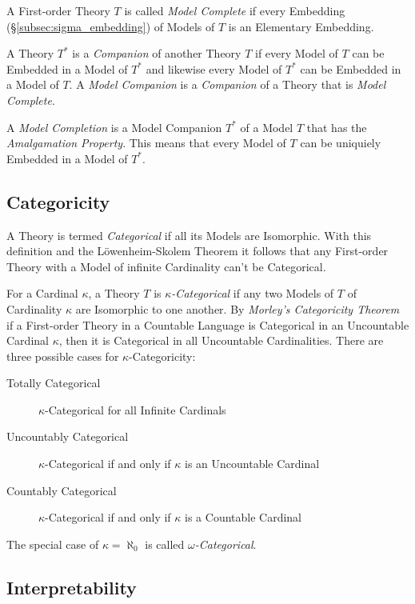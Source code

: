 \documentclass{article}
\begin{document}
A First-order Theory $T$ is called \emph{Model Complete} if every
Embedding (\S\ref{subsec:sigma_embedding}) of Models of $T$ is an
Elementary Embedding.

A Theory $T^*$ is a \emph{Companion} of another Theory $T$ if every
Model of $T$ can be Embedded in a Model of $T^*$ and likewise every
Model of $T^*$ can be Embedded in a Model of $T$. A \emph{Model
  Companion} is a \emph{Companion} of a Theory that is \emph{Model
  Complete}.

A \emph{Model Completion} is a Model Companion $T^*$ of a Model $T$
that has the \emph{Amalgamation Property}. This means that every Model
of $T$ can be uniquiely Embedded in a Model of $T^*$.

\subsection{Categoricity}

A Theory is termed \emph{Categorical} if all its Models are
Isomorphic. With this definition and the L\"owenheim-Skolem Theorem it
follows that any First-order Theory with a Model of infinite
Cardinality can't be Categorical.

For a Cardinal $\kappa$, a Theory $T$ is \emph{$\kappa$-Categorical}
if any two Models of $T$ of Cardinality $\kappa$ are Isomorphic to one
another. By \emph{Morley's Categoricity Theorem}\cite{morley65} if a
First-order Theory in a Countable Language is Categorical in an
Uncountable Cardinal $\kappa$, then it is Categorical in all
Uncountable Cardinalities. There are three possible cases for
$\kappa$-Categoricity:
\begin{description}
\item[Totally Categorical] $\kappa$-Categorical for all Infinite
  Cardinals
\item[Uncountably Categorical] $\kappa$-Categorical if and only if
  $\kappa$ is an Uncountable Cardinal
\item[Countably Categorical] $\kappa$-Categorical if and only if
  $\kappa$ is a Countable Cardinal
\end{description}
The special case of $\kappa = \aleph_0$ is called
\emph{$\omega$-Categorical}.

\subsection{Interpretability}
\end{document}

